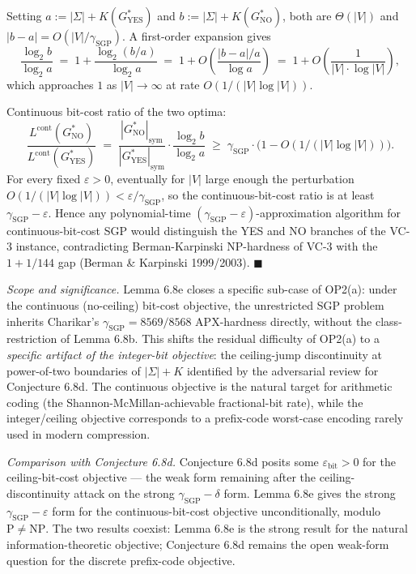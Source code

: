 \documentclass[
]{article}
\begin{document}
Setting $a := |\Sigma| + K(G^*_{\mathrm{YES}})$ and
$b := |\Sigma| + K(G^*_{\mathrm{NO}})$, both are $\Theta(|V|)$ and
$|b - a| = O(|V|/\gamma_{\mathrm{SGP}})$. A first-order expansion gives
\[
\frac{\log_2 b}{\log_2 a} \;=\; 1 + \frac{\log_2(b/a)}{\log_2 a} \;=\; 1 + O\!\left(\frac{|b-a|/a}{\log a}\right) \;=\; 1 + O\!\left(\frac{1}{|V| \cdot \log |V|}\right),
\]
which approaches $1$ as $|V| \to \infty$ at rate $O(1/(|V| \log |V|))$.

Continuous bit-cost ratio of the two optima:
\[
\frac{L^{\mathrm{cont}}(G^*_{\mathrm{NO}})}{L^{\mathrm{cont}}(G^*_{\mathrm{YES}})}
\;=\; \frac{|G^*_{\mathrm{NO}}|_{\mathrm{sym}}}{|G^*_{\mathrm{YES}}|_{\mathrm{sym}}} \cdot \frac{\log_2 b}{\log_2 a}
\;\geq\; \gamma_{\mathrm{SGP}} \cdot \bigl(1 - O(1/(|V| \log |V|))\bigr).
\]
For every fixed $\varepsilon > 0$, eventually for $|V|$ large enough
the perturbation $O(1/(|V| \log |V|)) < \varepsilon / \gamma_{\mathrm{SGP}}$,
so the continuous-bit-cost ratio is at least
$\gamma_{\mathrm{SGP}} - \varepsilon$. Hence any polynomial-time
$(\gamma_{\mathrm{SGP}} - \varepsilon)$-approximation algorithm for
continuous-bit-cost SGP would distinguish the YES and NO branches of
the VC-3 instance, contradicting Berman-Karpinski NP-hardness of VC-3
with the $1 + 1/144$ gap (Berman \& Karpinski 1999/2003).
\hfill$\blacksquare$

\emph{Scope and significance.} Lemma 6.8e closes a specific sub-case
of OP2(a): under the continuous (no-ceiling) bit-cost objective, the
unrestricted SGP problem inherits Charikar's $\gamma_{\mathrm{SGP}} =
8569/8568$ APX-hardness directly, without the class-restriction of
Lemma 6.8b. This shifts the residual difficulty of OP2(a) to a
\emph{specific artifact of the integer-bit objective}: the
ceiling-jump discontinuity at power-of-two boundaries of $|\Sigma| + K$
identified by the adversarial review for Conjecture 6.8d.
The continuous objective is the natural target for arithmetic coding
(the Shannon-McMillan-achievable fractional-bit rate), while the
integer/ceiling objective corresponds to a prefix-code worst-case
encoding rarely used in modern compression.

\emph{Comparison with Conjecture 6.8d.} Conjecture 6.8d posits some
$\varepsilon_{\mathrm{bit}} > 0$ for the ceiling-bit-cost objective ---
the weak form remaining after the ceiling-discontinuity attack
on the strong $\gamma_{\mathrm{SGP}} - \delta$ form. Lemma 6.8e gives
the strong $\gamma_{\mathrm{SGP}} - \varepsilon$ form for the
continuous-bit-cost objective unconditionally, modulo $\mathrm{P} \neq
\mathrm{NP}$. The two results coexist: Lemma 6.8e is the strong result
for the natural information-theoretic objective; Conjecture 6.8d
remains the open weak-form question for the discrete prefix-code
objective.
\end{document}
